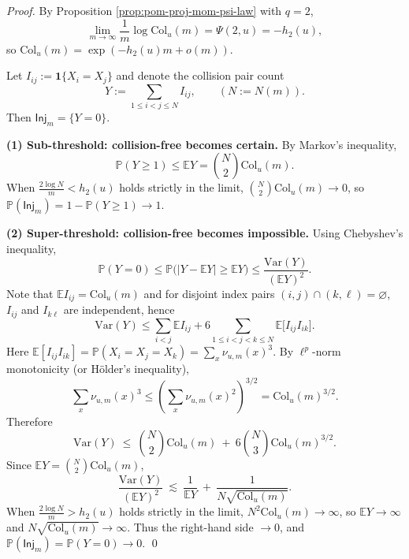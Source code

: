 \begin{proof}
By Proposition \ref{prop:pom-proj-mom-psi-law} with \(q=2\),
\[
\lim_{m\to\infty}\frac{1}{m}\log \mathrm{Col}_u(m)
=\Psi(2,u)
=-h_2(u),
\]
so \(\mathrm{Col}_u(m)=\exp(-h_2(u)m+o(m))\).
\par
Let
\(
I_{ij}:=\mathbf{1}\{X_i=X_j\}
\)
and denote the collision pair count
\[
Y:=\sum_{1\le i<j\le N} I_{ij},\qquad (N:=N(m)).
\]
Then \(\mathsf{Inj}_m=\{Y=0\}\).
\par
\textbf{(1) Sub-threshold: collision-free becomes certain.}
By Markov's inequality,
\[
\mathbb{P}(Y\ge 1)\le \mathbb{E}Y=\binom{N}{2}\mathrm{Col}_u(m).
\]
When \(\frac{2\log N}{m}<h_2(u)\) holds strictly in the limit,
\(
\binom{N}{2}\mathrm{Col}_u(m)\to 0
\), so \(\mathbb{P}(\mathsf{Inj}_m)=1-\mathbb{P}(Y\ge 1)\to 1\).
\par
\textbf{(2) Super-threshold: collision-free becomes impossible.}
Using Chebyshev's inequality,
\[
\mathbb{P}(Y=0)
\le
\mathbb{P}\bigl(|Y-\mathbb{E}Y|\ge \mathbb{E}Y\bigr)
\le
\frac{\mathrm{Var}(Y)}{(\mathbb{E}Y)^2}.
\]
Note that \(\mathbb{E}I_{ij}=\mathrm{Col}_u(m)\) and for disjoint index pairs \((i,j)\cap(k,\ell)=\varnothing\), \(I_{ij}\) and \(I_{k\ell}\) are independent, hence
\[
\mathrm{Var}(Y)
\le
\sum_{i<j}\mathbb{E}I_{ij}
 + 6\!\!\sum_{1\le i<j<k\le N}\!\!\mathbb{E}\bigl[I_{ij}I_{ik}\bigr].
\]
Here
\(
\mathbb{E}[I_{ij}I_{ik}]
=\mathbb{P}(X_i=X_j=X_k)
=\sum_x \nu_{u,m}(x)^3
\).
By \(\ell^p\)-norm monotonicity (or H\"older's inequality),
\[
\sum_x \nu_{u,m}(x)^3
\le
\left(\sum_x \nu_{u,m}(x)^2\right)^{3/2}
=\mathrm{Col}_u(m)^{3/2}.
\]
Therefore
\[
\mathrm{Var}(Y)\ \le\ \binom{N}{2}\mathrm{Col}_u(m)\ +\ 6\binom{N}{3}\mathrm{Col}_u(m)^{3/2}.
\]
Since \(\mathbb{E}Y=\binom{N}{2}\mathrm{Col}_u(m)\),
\[
\frac{\mathrm{Var}(Y)}{(\mathbb{E}Y)^2}
\ \lesssim\
\frac{1}{\mathbb{E}Y}
\ +\
\frac{1}{N\sqrt{\mathrm{Col}_u(m)}}.
\]
When \(\frac{2\log N}{m}>h_2(u)\) holds strictly in the limit, \(N^2\mathrm{Col}_u(m)\to\infty\), so \(\mathbb{E}Y\to\infty\) and \(N\sqrt{\mathrm{Col}_u(m)}\to\infty\). Thus the right-hand side \(\to 0\), and \(\mathbb{P}(\mathsf{Inj}_m)=\mathbb{P}(Y=0)\to 0\).
\qed
\end{proof}


